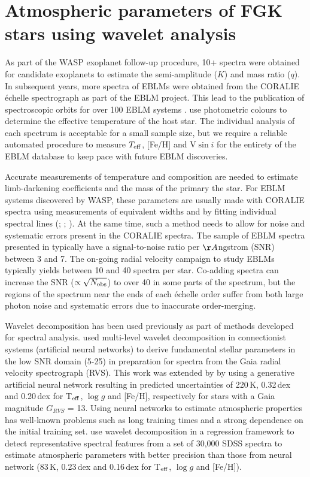 \chapter{Atmospheric parameters of FGK stars using wavelet analysis}\label{chapter:wavelet}

As part of the WASP exoplanet follow-up procedure, 10+ spectra were obtained for candidate exoplanets to estimate the semi-amplitude ($K$) and mass ratio ($q$). In subsequent years, more spectra of EBLMs were obtained from the CORALIE \'{e}chelle spectrograph \citep{2001Msngr.105....1Q} as part of the EBLM project. This lead to the publication of spectroscopic orbits for over 100 EBLM systems \citep{Triaud2017}. \citet{Triaud2017} use photometric colours to determine the effective temperature of the host star. The individual analysis of each spectrum is acceptable for a small sample size, but we require a reliable automated procedure to measure $T_{\rm eff}$, [Fe/H] and V$\sin i$ for the entirety of the EBLM database to keep pace with future EBLM discoveries.

Accurate measurements of temperature and composition are needed to estimate limb-darkening coefficients and the mass of the primary the star. For EBLM systems discovered by WASP, these parameters are usually made with CORALIE spectra using measurements of equivalent widths and by fitting individual spectral lines (\citealt{2009A&A...496..259G}; \citealt{Doyle2013}; \citealt{Doyle2015}). At the same time, such a method needs to allow for noise and systematic errors present in the CORALIE spectra. The sample of EBLM spectra presented in \citet{2014A&A...572A..50G} typically have a signal-to-noise ratio per $\AA$ngstrom (SNR) between 3 and 7. The on-going radial velocity campaign to study EBLMs typically yields between 10 and 40 spectra per star. Co-adding spectra can increase the SNR ($\propto \sqrt{N_{\rm obs}}$) to over 40 in some parts of the spectrum, but the regions of the spectrum near the ends of each \'{e}chelle order suffer from both large photon noise and systematic errors due to inaccurate order-merging.  

Wavelet decomposition has been used previously as part of methods developed for spectral analysis. \citet{2010PASP..122..608M} used multi-level wavelet decomposition in connectionist systems (artificial neural networks) to derive fundamental stellar parameters in the low SNR domain (5-25) in preparation for spectra from the Gaia radial velocity spectrograph (RVS). This work was extended by \citet{2016A&A...594A..68D} by using a generative artificial neural network resulting in predicted uncertainties of 220\,K, 0.32\,dex and 0.20\,dex for T$_{\rm eff}$, $\log g$ and [Fe/H], respectively for stars with a Gaia magnitude $G_{RVS}$ = 13. Using neural networks to estimate atmospheric properties has well-known problems such as long training times and a strong dependence on the initial training set. \citet{2015ApJS..218....3L} use wavelet decomposition in a regression framework to detect representative spectral features from a set of 30,000 SDSS spectra to estimate atmospheric parameters with better precision than those from neural network (83\,K, 0.23\,dex
and 0.16\,dex for T$_{\rm eff}$, $\log g$ and [Fe/H]).

